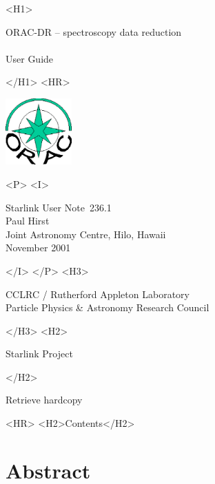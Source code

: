 \documentclass[twoside,11pt]{article}
\newcommand{\stardoccategory}  {Starlink User Note}
\newcommand{\stardocsource}    {sun\stardocnumber}
\newcommand{\stardocnumber}    {236.1}
\newcommand{\stardocauthors}   {Paul Hirst \\
                                Joint Astronomy Centre, Hilo, Hawaii}
\newcommand{\stardocdate}      {November 2001}
\newcommand{\stardoctitle}     {ORAC-DR -- spectroscopy data reduction}
\newcommand{\stardocversion}   {}
\newcommand{\stardocmanual}    {User Guide}
\newcommand{\htmladdnormallink}[2]{#1}
\newcommand{\htmladdimg}[1]{}
\newcommand{\htmlref}[2]{#1}
\newcommand{\htmladdtonavigation}[1]{}
\newcommand{\xlabel}[1]{}
\renewcommand{\_}{\texttt{\symbol{95}}}
\begin{document}
\begin{htmlonly}
   \xlabel{}
   \begin{rawhtml} <H1> \end{rawhtml}
      \stardoctitle\\
      \stardocversion\\
      \stardocmanual
   \begin{rawhtml} </H1> <HR> \end{rawhtml}

\includegraphics[width=1.0in]{sun236_logo.eps}

   \begin{rawhtml} <P> <I> \end{rawhtml}
   \stardoccategory\ \stardocnumber \\
   \stardocauthors \\
   \stardocdate
   \begin{rawhtml} </I> </P> <H3> \end{rawhtml}
      \htmladdnormallink{CCLRC / Rutherford Appleton Laboratory}
                        {http://www.cclrc.ac.uk} \\
      \htmladdnormallink{Particle Physics \& Astronomy Research Council}
                        {http://www.pparc.ac.uk} \\
   \begin{rawhtml} </H3> <H2> \end{rawhtml}
      \htmladdnormallink{Starlink Project}{http://www.starlink.rl.ac.uk/}
   \begin{rawhtml} </H2> \end{rawhtml}
   \htmladdnormallink{\htmladdimg{source.gif} Retrieve hardcopy}
      {http://www.starlink.rl.ac.uk/cgi-bin/hcserver?\stardocsource}\\

  \label{stardoccontents}
  \begin{rawhtml} 
    <HR>
    <H2>Contents</H2>
  \end{rawhtml}
  \htmladdtonavigation{\htmlref{\htmladdimg{contents_motif.gif}}
        {stardoccontents}}

  \section{\xlabel{abstract}Abstract}
\end{htmlonly}
\end{document}
